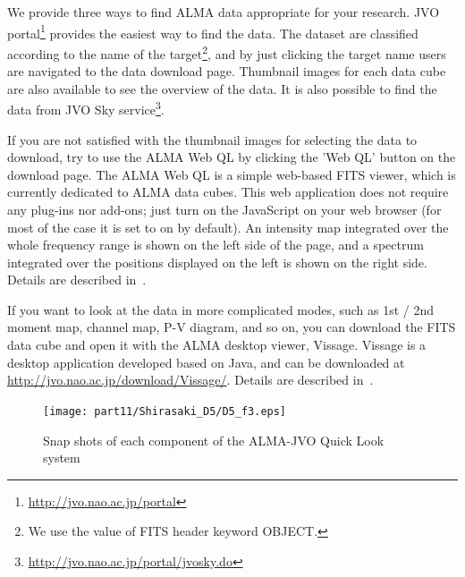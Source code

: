 We provide three ways to find ALMA data appropriate for your research. JVO portal\footnote{\url{http://jvo.nao.ac.jp/portal}}\citep{Shirasaki_2011} provides the easiest way to find the data. The dataset are classified according to the name of the target\footnote{We use the value of FITS header keyword OBJECT.}, and by just clicking the target name users are navigated to the data download page. Thumbnail images for each data cube are also available to see the overview of  the data. It is also possible to find the data from JVO Sky  service\footnote{\url{http://jvo.nao.ac.jp/portal/jvosky.do}}.

If you are not satisfied with the thumbnail images for selecting the data to download, try to use the ALMA Web QL by clicking the 'Web QL' button on the download page. The ALMA Web QL is a simple web-based FITS viewer, which is currently dedicated to ALMA data cubes. This web application does not require any plug-ins nor add-ons; just turn on the JavaScript on your web browser (for most of the case it is set to on by default). An intensity map integrated over the whole frequency range is shown on the left side of the page, and a spectrum integrated over the positions displayed on the left is shown on the right side. Details are described in~\cite{O10_adassxxii}.

If you want to look at the data in more complicated modes, such as 1st / 2nd moment map, channel map, P-V diagram, and so on, you can download the FITS data cube and open it with the ALMA desktop viewer, Vissage. Vissage is a desktop application developed based on Java, and can be downloaded at \url{http://jvo.nao.ac.jp/download/Vissage/}. Details are described in~\cite{P047_adassxxii}.


\begin{figure}[t]
\begin{center}
\texttt{[image: part11/Shirasaki\_D5/D5\_f3.eps]}
\caption{Snap shots of each component of the ALMA-JVO Quick Look system}
\label{Shfig:arch}
\end{center}
\end{figure}


